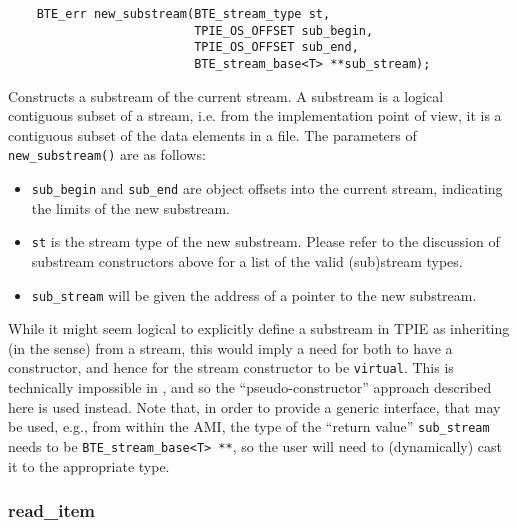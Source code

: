 \begin{lstlisting}
    BTE_err new_substream(BTE_stream_type st, 
                          TPIE_OS_OFFSET sub_begin, 
                          TPIE_OS_OFFSET sub_end, 
                          BTE_stream_base<T> **sub_stream);
\end{lstlisting}

\noindent
Constructs a substream of the current stream.  A substream is a
logical contiguous subset of a stream, i.e. from the implementation
point of view, it is a contiguous subset of the data elements in a
file.  The parameters of \lstinline|new_substream()| are as follows:
\begin{itemize}
\item \lstinline|sub_begin| and \lstinline|sub_end| are object offsets
  into the current stream, indicating the limits of the new substream.
    
\item \lstinline|st| is the stream type of the new substream. Please
  refer to the discussion of substream constructors above for a list
  of the valid (sub)stream types.
  
\item \lstinline|sub_stream| will be given the address of a pointer to
  the new substream.
\end{itemize}

While it might seem logical to explicitly define a substream in TPIE
as inheriting (in the \CPP{} sense) from a stream, this would imply a
need for both to have a constructor, and hence for the stream
constructor to be \lstinline|virtual|. This is technically impossible
in \CPP{},  and so the ``pseudo-constructor''
approach described here is used instead. Note that, in order to provide a generic
interface, that may be used, e.g., from within the AMI, the type of
the ``return value'' \lstinline|sub_stream| needs to be
\lstinline|BTE_stream_base<T> **|, so the user will need to
(dynamically) cast it to the appropriate type.

\vspace*{\baselineskip}
\subsubsection{read\_item}

